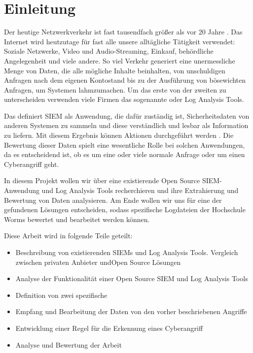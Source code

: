 \section{Einleitung}

Der heutige Netzwerkverkehr ist fast tausendfach größer als vor 20 Jahre \citep{Roser_I}. Das Internet wird heutzutage für fast alle unsere alltägliche Tätigkeit verwendet: Soziale Netzwerke, Video und Audio-Streaming, Einkauf, behördliche Angelegenheit und viele andere. So viel Verkehr generiert eine unermessliche Menge von Daten, die alle mögliche Inhalte beinhalten, von unschuldigen Anfragen nach dem eigenen Kontostand bis zu der Ausführung von bösewichten Anfragen, um Systemen lahmzumachen. Um das erste von der zweiten zu unterscheiden verwenden viele Firmen das sogenannte  oder Log Analysis Tools.

Das  definiert \acrshort{SIEM} als Anwendung, die dafür zuständig ist, Sicherheitsdaten von anderen Systemen zu sammeln und diese verständlich und lesbar als Information zu liefern. Mit diesem Ergebnis können Aktionen durchgeführt werden \citep{NIST_SIEM}. Die Bewertung dieser Daten spielt eine wesentliche Rolle bei solchen Anwendungen, da es entscheidend ist, ob es um eine oder viele normale Anfrage oder um einen \gls{Cyberangriff} geht.

In diesem Projekt wollen wir über eine existierende \gls{Open Source} \gls{SIEM}-Anwendung und Log Analysis Tools recherchieren und ihre Extrahierung und Bewertung von Daten analysieren. Am Ende wollen wir uns für eine der gefundenen Lösungen entscheiden, sodass spezifische Logdateien der Hochschule Worms bewertet und bearbeitet werden können.

Diese Arbeit wird in folgende Teile geteilt:





\begin{itemize}[noitemsep]
   \item Beschreibung von existierenden \glspl{SIEM} und Log Analysis Tools. Vergleich zwischen privaten Anbieter und\gls{Open Source} Lösungen
   \item Analyse der Funktionalität einer \gls{Open Source} \gls{SIEM} und Log Analysis Tools
   \item Definition von zwei spezifische 
   \item Empfang und Bearbeitung der Daten von den vorher beschriebenen Angriffe
   \item Entwicklung einer Regel für die Erkennung eines \gls{Cyberangriff}
   \item Analyse und Bewertung der Arbeit
\end{itemize}

